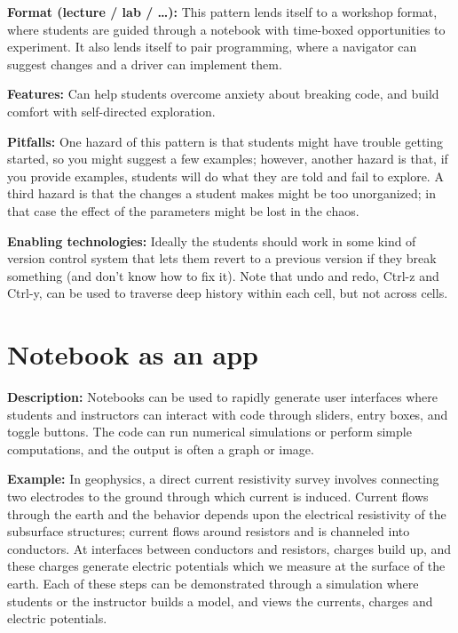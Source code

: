 \documentclass[]{book}
\begin{document}
\textbf{Format (lecture / lab / \ldots):}
This pattern lends itself to a workshop format, where students are guided through a
notebook with time-boxed opportunities to experiment. It also lends itself to pair
programming, where a navigator can suggest changes and a driver can implement them.

\textbf{Features:}
Can help students overcome anxiety about breaking code, and build comfort with
self-directed exploration.

\textbf{Pitfalls:}
One hazard of this pattern is that students might have trouble getting started,
so you might suggest a few examples; however, another hazard is that, if you provide
examples, students will do what they are told and fail to explore. A third hazard
is that the changes a student makes might be too unorganized; in that case the
effect of the parameters might be lost in the chaos.

\textbf{Enabling technologies:}
Ideally the students should work in some kind of version control system that lets
them revert to a previous version if they break something (and don't know how to
fix it). Note that undo and redo, Ctrl-z and Ctrl-y, can be used to traverse
deep history within each cell, but not across cells.

\hypertarget{notebook-as-an-app}{%
\section{Notebook as an app}\label{notebook-as-an-app}}

\textbf{Description:}
Notebooks can be used to rapidly generate user interfaces where
students and instructors can interact with code through sliders,
entry boxes, and toggle buttons. The code can run numerical simulations
or perform simple computations, and the output is often a graph or
image.

\textbf{Example:}
In geophysics, a direct current resistivity survey involves connecting
two electrodes to the ground through which current is
induced. Current flows through the earth and the behavior depends
upon the electrical resistivity of the subsurface structures; current
flows around resistors and is channeled into conductors. At interfaces
between conductors and resistors, charges build up, and these charges
generate electric potentials which we measure at the surface of the
earth. Each of these steps can be demonstrated through a simulation
where students or the instructor builds a model, and views the
currents, charges and electric potentials.
\end{document}

